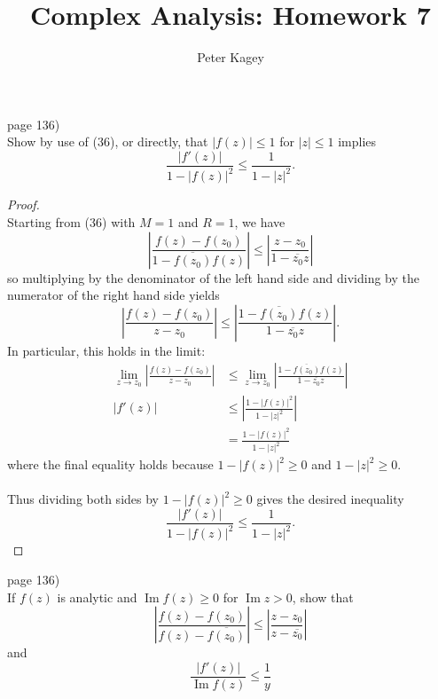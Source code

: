 \documentclass{article}
\newenvironment{problem}[2][Problem]{\begin{trivlist}
\item[\hskip \labelsep {\bfseries #1}\hskip \labelsep {\bfseries #2.}]}{\end{trivlist}}
\begin{document}
\title{Complex Analysis: Homework 7}
\author{Peter Kagey}

\maketitle

\begin{problem}{1} (page 136) \\
  Show by use of (36), or directly, that $|f(z)| \leq 1$ for $|z| \leq 1$
  implies \[
    \frac{|f'(z)|}{1 - |f(z)|^2} \leq \frac{1}{1 - |z|^2}.
  \]
\end{problem}
\begin{proof} \text{} \\
  Starting from (36) with $M = 1$ and $R = 1$, we have \[
    \left| \frac{f(z) - f(z_0)}{1 - \overline{f(z_0)}f(z)} \right| \leq
    \left| \frac{z - z_0}{1 - \overline{z_0}z} \right|
  \] so multiplying by the denominator of the left hand side and dividing by the
  numerator of the right hand side yields \[
  \left| \frac{f(z) - f(z_0)}{z - z_0} \right| \leq
  \left| \frac{1 - \overline{f(z_0)}f(z)}{1 - \overline{z_0}z} \right|.
  \]
  In particular, this holds in the limit: \begin{align*}
    \lim_{z \rightarrow z_0} \left| \frac{f(z) - f(z_0)}{z - z_0} \right| &\leq
    \lim_{z \rightarrow z_0} \left| \frac{1 - \overline{f(z_0)}f(z)}{1 - \overline{z_0}z} \right| \\
    |f'(z)| &\leq \left|\frac{1 - |f(z)|^2}{1 - |z|^2}\right|\\
    &= \frac{1 - |f(z)|^2}{1 - |z|^2}
  \end{align*}
  where the final equality holds because $1 - |f(z)|^2 \geq 0$ and
  $1 - |z|^2 \geq 0$.\\~\\
  Thus dividing both sides by $1 - |f(z)|^2 \geq 0$ gives the desired inequality
  \[
    \frac{|f'(z)|}{1 - |f(z)|^2} \leq \frac{1}{1 - |z|^2}.
  \]
\end{proof}
\pagebreak

\begin{problem}{2} (page 136) \\
  If $f(z)$ is analytic and $\operatorname{Im} f(z) \geq 0$ for
  $\operatorname{Im} z > 0$, show that \[
    \left|\frac{f(z)-f(z_0)}{f(z)-\overline{f(z_0)}}\right| \leq
    \left|\frac{z-z_0}{z - \overline{z_0}}\right|
  \] and \[
    \frac{|f'(z)|}{\operatorname{Im} f(z)} \leq \frac{1}{y}
  \]
\end{problem}
\end{document}
